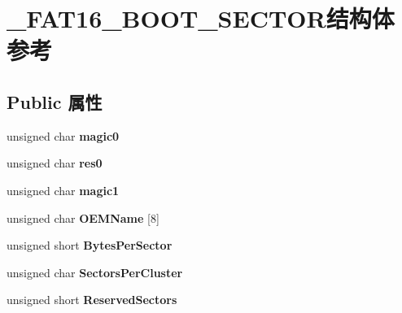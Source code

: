 \hypertarget{struct___f_a_t16___b_o_o_t___s_e_c_t_o_r}{}\section{\+\_\+\+F\+A\+T16\+\_\+\+B\+O\+O\+T\+\_\+\+S\+E\+C\+T\+O\+R结构体 参考}
\label{struct___f_a_t16___b_o_o_t___s_e_c_t_o_r}
\subsection*{Public 属性}
\begin{DoxyCompactItemize}
\item 
\mbox{\label{struct___f_a_t16___b_o_o_t___s_e_c_t_o_r_aa629ee092dec756b3c44f15dfeff1f8f}} 
unsigned char {\bfseries magic0}
\item 
\mbox{\label{struct___f_a_t16___b_o_o_t___s_e_c_t_o_r_a0944b2c81dc311c83fbcb13ff9b2349d}} 
unsigned char {\bfseries res0}
\item 
\mbox{\label{struct___f_a_t16___b_o_o_t___s_e_c_t_o_r_a36509645da4ea1ea8f07a60508e5d9d3}} 
unsigned char {\bfseries magic1}
\item 
\mbox{\label{struct___f_a_t16___b_o_o_t___s_e_c_t_o_r_ab90b9c31f9da6d708cfb5b482e6c1bd1}} 
unsigned char {\bfseries O\+E\+M\+Name} \mbox{[}8\mbox{]}
\item 
\mbox{\label{struct___f_a_t16___b_o_o_t___s_e_c_t_o_r_a71bd32eb950e0c7229fc36fc0c658c2e}} 
unsigned short {\bfseries Bytes\+Per\+Sector}
\item 
\mbox{\label{struct___f_a_t16___b_o_o_t___s_e_c_t_o_r_ab276df7390744fdaa353a5831b1ab753}} 
unsigned char {\bfseries Sectors\+Per\+Cluster}
\item 
\mbox{\label{struct___f_a_t16___b_o_o_t___s_e_c_t_o_r_abb28789fc9fa3b831161915b9cfb9666}} 
unsigned short {\bfseries Reserved\+Sectors}

\end{DoxyCompactItemize}
